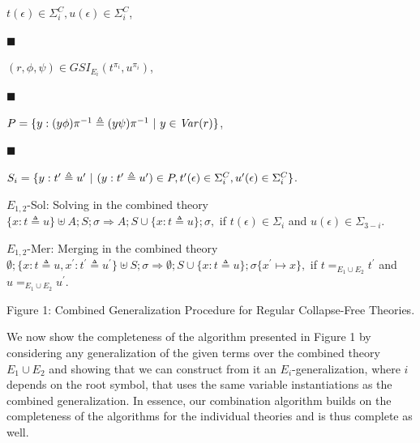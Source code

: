 \documentclass[10pt,a4paper]{amsart}
\begin{document}
$t(\epsilon)\in{\Sigma}^{C}_{i},u(\epsilon)\in{\Sigma}^{C}_{i}$,\par
 
 
 
\par\noindent  $\blacksquare$ 
 
$(r,\phi,\psi)\in GSI_{E_{i}}(t^{\pi_{i}},u^{\pi_{i}})$,\par
 
 
 
\par\noindent  $\blacksquare$ 
 
$P=\{y:(y\phi)\pi^{-1}\triangleq(y\psi)\pi^{-1}\leavevmode\nobreak\ |\leavevmode\nobreak\ y\in\mathit{Var}(r)\}$,\par
 
 
 
\par\noindent  $\blacksquare$ 
 
$S_{i}=\{y:t^{\prime}\triangleq u^{\prime}\leavevmode\nobreak\ |\leavevmode\nobreak\ (y:t^{\prime}\triangleq u^{\prime})\in P,t^{\prime}(\epsilon)\in{\Sigma}^{C}_{i},u^{\prime}(\epsilon)\in{\Sigma}^{C}_{i}\}$.\par
 
 
      
\par
 
$E_{1,2}$-Sol: Solving in the combined theory  $\{x:t\triangleq u\}\uplus A;S;\sigma\Longrightarrow A;S\cup\{x:t\triangleq u\};\sigma,$ if $t(\epsilon)\in\Sigma_{i}$ and $u(\epsilon)\in\Sigma_{3-i}$.\par
      
\par
 
$E_{1,2}$-Mer: Merging in the combined theory  $\emptyset;\{x:t\triangleq u,x^{\prime}:t^{\prime}\triangleq u^{\prime}\}\uplus
S;\sigma\Longrightarrow\emptyset;S\cup\{x:t\triangleq u\};\sigma\{x^{\prime}\mapsto x\},$ if $t=_{E_{1}\cup E_{2}}t^{\prime}$ and $u=_{E_{1}\cup E_{2}}u^{\prime}$.\par
    
Figure 1: Combined Generalization Procedure for Regular Collapse-Free Theories.\par
 
 
 
We now show the completeness of the algorithm presented in Figure 1 by considering any generalization of the given terms over the combined theory $E_{1}\cup E_{2}$ and showing that we can construct from it an $E_{i}$-generalization, where $i$ depends on the root symbol, that uses the same variable instantiations as the combined generalization. In essence, our combination algorithm builds on the completeness of the algorithms for the individual theories and is thus complete as well.\par
 
\end{document}
